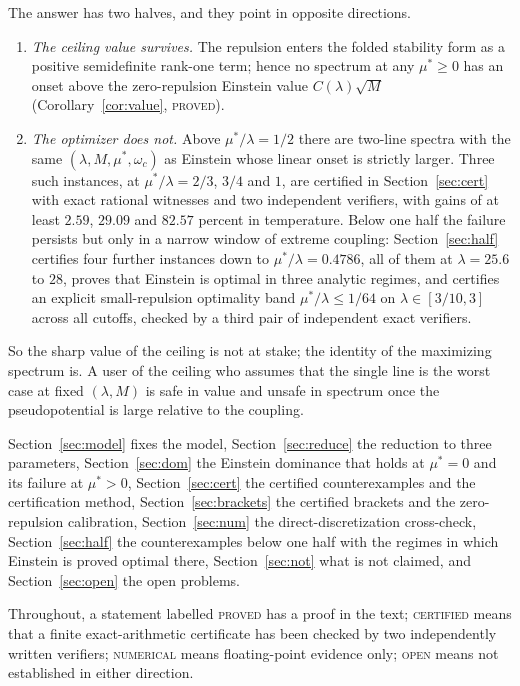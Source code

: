 \documentclass[11pt]{article}
\newcommand{\muS}{\mu^{*}}
\theoremstyle{definition}
\theoremstyle{remark}
\begin{document}
The answer has two halves, and they point in opposite directions.
\begin{enumerate}[label=(\arabic*),leftmargin=2.2em]
\item \emph{The ceiling value survives.} The repulsion enters the folded stability form
as a positive semidefinite rank-one term; hence no spectrum at any $\muS\ge0$ has an
onset above the zero-repulsion Einstein value $C(\lambda)\sqrt M$
(Corollary~\ref{cor:value}, \textsc{proved}).
\item \emph{The optimizer does not.} Above $\muS/\lambda=1/2$ there are two-line spectra
with the same $(\lambda,M,\muS,\omega_c)$ as Einstein whose linear onset is strictly
larger. Three such instances, at $\muS/\lambda=2/3$, $3/4$ and $1$, are certified in
Section~\ref{sec:cert} with exact rational witnesses and two independent verifiers, with
gains of at least $2.59$, $29.09$ and $82.57$ percent in temperature. Below one half the
failure persists but only in a narrow window of extreme coupling: Section~\ref{sec:half}
certifies four further instances down to $\muS/\lambda=0.4786$, all of them at
$\lambda=25.6$ to $28$, proves that Einstein is optimal in three analytic regimes, and
certifies an explicit small-repulsion optimality band $\muS/\lambda\le1/64$ on
$\lambda\in[3/10,3]$ across all cutoffs, checked by a third pair of independent exact
verifiers.
\end{enumerate}
So the sharp value of the ceiling is not at stake; the identity of the maximizing spectrum
is. A user of the ceiling who assumes that the single line is the worst case at fixed
$(\lambda,M)$ is safe in value and unsafe in spectrum once the pseudopotential is large
relative to the coupling.

Section~\ref{sec:model} fixes the model, Section~\ref{sec:reduce} the reduction to three
parameters, Section~\ref{sec:dom} the Einstein dominance that holds at $\muS=0$ and its
failure at $\muS>0$, Section~\ref{sec:cert} the certified counterexamples and the
certification method, Section~\ref{sec:brackets} the certified brackets and the
zero-repulsion calibration, Section~\ref{sec:num} the direct-discretization cross-check,
Section~\ref{sec:half} the counterexamples below one half with the regimes in which
Einstein is proved optimal there, Section~\ref{sec:not} what is not claimed, and
Section~\ref{sec:open} the open problems.

Throughout, a statement labelled \textsc{proved} has a proof in the text;
\textsc{certified} means that a finite exact-arithmetic certificate has been checked by
two independently written verifiers; \textsc{numerical} means floating-point evidence
only; \textsc{open} means not established in either direction.
\end{document}
